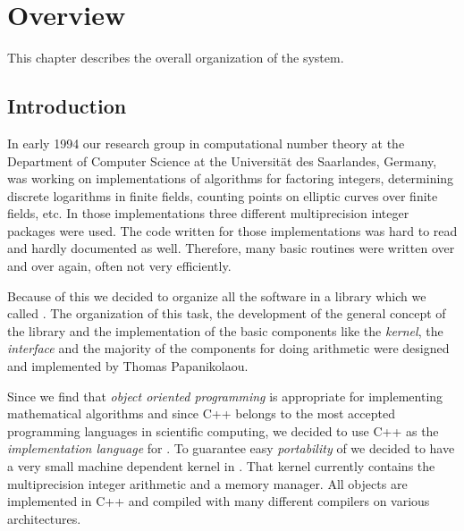

\newcommand{\Pari}{\textbf{Pari}\xspace}
\newcommand{\Kant}{\textbf{Kant}\xspace}
\newcommand{\Simath}{\textbf{Simath}\xspace}
\newcommand{\Maple}{\textbf{Maple}\xspace}
\newcommand{\Mathematica}{\textbf{Mathematica}\xspace}


\chapter{Overview}

This chapter describes the overall organization of the \LiDIA system.


\section{Introduction}\label{sect:Pref}

In early 1994 our research group in computational number theory at the Department of Computer
Science at the Universit\"at des Saarlandes, Germany, was working on implementations of
algorithms for factoring integers, determining discrete logarithms in finite fields, counting
points on elliptic curves over finite fields, etc.  In those implementations three different
multiprecision integer packages were used.  The code written for those implementations was hard
to read and hardly documented as well.  Therefore, many basic routines were written over and
over again, often not very efficiently.

Because of this we decided to organize all the software in a library which we called
\Index{\LiDIA}.  The organization of this task, the development of the general concept of the
library and the implementation of the basic components like the \emph{kernel}, the
\emph{interface} and the majority of the components for doing arithmetic were designed and
implemented by Thomas Papanikolaou.

Since we find that \emph{object oriented programming} is appropriate for implementing
mathematical algorithms and since C++ belongs to the most accepted programming languages in
scientific computing, we decided to use C++ as the \emph{implementation language} for \LiDIA.
To guarantee easy \emph{portability} of \LiDIA we decided to have a very small machine dependent
kernel in \LiDIA.  That kernel currently contains the multiprecision integer arithmetic and a
memory manager.  All \LiDIA objects are implemented in C++ and compiled with many different
compilers on various architectures.

